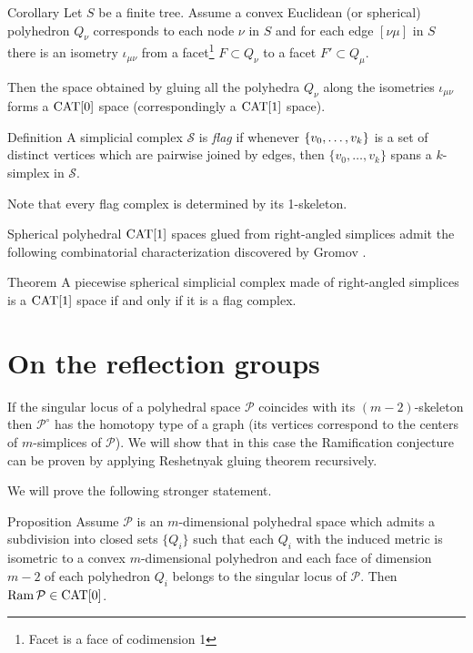 \documentclass{compositio}
\begin{document}
\begin{thm}{Corollary}\label{cor:resh}
Let $S$ be a finite tree.
Assume a convex Euclidean (or spherical) polyhedron $Q_\nu$
corresponds to each node $\nu$ in $S$
and for each edge $[\nu\mu]$ in $S$
there is an isometry $\iota_{\mu\nu}$
from a facet\footnote{Facet is a face of codimension 1} $F\subset Q_\nu$ to a facet $F'\subset Q_\mu$.

Then the space obtained by gluing all the polyhedra $Q_\nu$ along the isometries $\iota_{\mu\nu}$ forms a $\mathrm{CAT}[0]$ space (correspondingly a $\mathrm{CAT}[1]$ space).
\end{thm}


\begin{thm}{Definition}
A simplicial complex $\mathcal{S}$ is \emph{flag} if whenever $\{v_0,\z\dots,v_k\}$
is a set of distinct vertices which are pairwise joined by edges, then $\{v_0,\dots,v_k\}$
spans a $k$-simplex in $\mathcal{S}$.
\end{thm}

Note that every flag complex is determined by its 1-skeleton.

Spherical polyhedral $\mathrm{CAT}[1]$ spaces glued from right-angled simplices
admit the following combinatorial characterization discovered by Gromov \cite[p. 122]{gromov-hyp-group}.

\begin{thm}{Theorem}
 A piecewise spherical simplicial complex made of right-angled simplices is a $\mathrm{CAT}[1]$ space if and only if it is a flag complex.
\end{thm}



\section{On the reflection groups}

If the singular locus of a polyhedral space $\mathcal{P}$ coincides with its $(m-2)$-skeleton
then $\mathcal{P}^\circ$ has the homotopy type of a graph 
(its vertices correspond to the centers of $m$-simplices of $\mathcal{P}$).
We will show that in this case the Ramification conjecture can be proven by applying Reshetnyak gluing theorem recursively.

We will prove the following stronger statement.

\begin{thm}{Proposition}\label{prop:ramresh}
Assume $\mathcal{P}$ is an $m$-dimensional polyhedral space which
admits a subdivision into closed sets $\{Q_i\}$
such that each $Q_i$ with the induced metric is isometric to a convex $m$-dimensional polyhedron and each face  of dimension $m-2$ of each polyhedron $Q_i$ belongs to the singular locus of $\mathcal{P}$.
Then $\mathop{\rm Ram}\nolimits \mathcal{P}\in\mathrm{CAT}[0]$.
\end{thm}
\end{document}
